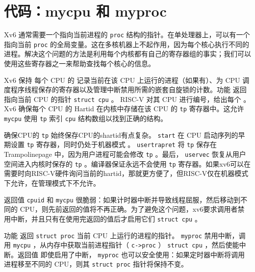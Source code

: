     \section{代码：mycpu 和 myproc  }     

Xv6 通常需要一个指向当前进程的    \lstinline{proc}    结构的指针。在单处理器上，可以有一个指向当前    \lstinline{proc}    的全局变量。这在多核机器上不起作用，因为每个核心执行不同的进程。解决这个问题的方法是利用每个内核都有自己的寄存器组的事实；我们可以使用这些寄存器之一来帮助查找每个核心的信息。  

Xv6 保持
 每个 CPU 的       
        记录当前在该 CPU 上运行的进程（如果有）、为 CPU 调度程序线程保存的寄存器以及管理中断禁用所需的嵌套自旋锁的计数。功能
        返回指向当前 CPU 的指针
    \lstinline{struct cpu}    。 RISC-V 对其 CPU 进行编号，给出每个        。 Xv6 确保每个 CPU 的 Hartid 在内核中存储在该 CPU 的    \lstinline{tp}    寄存器中。这允许
    \lstinline{mycpu}    使用    \lstinline{tp}    索引    \lstinline{cpu}    结构数组以找到正确的结构。  

确保CPU的   \lstinline{tp}   始终保存CPU的shartid有点复杂。    \lstinline{start}    在 CPU 启动序列的早期设置    \lstinline{tp}    寄存器，同时仍处于机器模式
        。
    \lstinline{usertrapret}    将    \lstinline{tp}    保存在 Trampolinepage 中，因为用户进程可能会修改    \lstinline{tp}    。最后，   \lstinline{uservec}    恢复从用户空间进入内核时保存的    \lstinline{tp}   
        。编译器保证永远不会使用    \lstinline{tp}    寄存器。如果xv6可以在需要时向RISC-V硬件询问当前的hartid，那就更方便了，但RISC-V仅在机器模式下允许，在管理模式下不允许。  

返回值
    \lstinline{cpuid}    和
    \lstinline{mycpu}    很脆弱：如果计时器中断并导致线程屈服，然后移动到不同的 CPU，则先前返回的值将不再正确。为了避免这个问题，xv6要求调用者禁用中断，并且只有在使用完返回的值后才启用它们
    \lstinline{struct cpu}    。  

功能
        返回
    \lstinline{struct proc}    当前 CPU 上运行的进程的指针。
    \lstinline{myproc}    禁用中断，调用
    \lstinline{mycpu}   ，从内存中获取当前进程指针（   \lstinline{c->proc}   ）
    \lstinline{struct cpu}   ，然后使能中断。返回值
 即使启用了中断，   \lstinline{myproc}    也可以安全使用：如果定时器中断将调用进程移至不同的 CPU，则其
    \lstinline{struct proc}    指针将保持不变。
